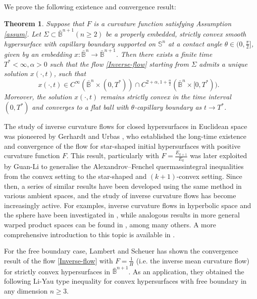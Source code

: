 \documentclass[11pt,reqno]{amsart}
\newtheorem{thm}{Theorem}[section]
\theoremstyle{definition}
\theoremstyle{remark}
\numberwithin{equation}{section}
\renewcommand{\(}{\left(}
\renewcommand{\)}{\right)}
\renewcommand{\-}{\overline}
\begin{document}
We prove the following  existence and convergence result:
\begin{thm}
Suppose that $F$ is a curvature function satisfying Assumption \ref{assum}. Let $\Sigma\subset\bar{\mathbb{B}}^{n+1} (n\geq 2)$ be a properly embedded, strictly convex smooth hypersurface with capillary boundary supported on $\mathbb{S}^n$ at a contact angle $\theta\in(0,\frac{\pi}{2}]$, given by an embedding $x:\bar{\mathbb{B}}^n\to\bar{\mathbb{B}}^{n+1}$. Then there exists a finite time $T^{*}<\infty,\alpha>0$ such that the flow \eqref{Inverse-flow} starting from $\Sigma$ admits a unique solution $x(\cdot,t)$, such that
	\begin{equation*}
		x(\cdot,t)\in C^{\infty}(\bar{\mathbb{B}}^n\times(0,T^{*}))\cap C^{2+\alpha,1+\frac{\alpha}{2}}(\bar{\mathbb{B}}^n\times[0,T^{*})).
	\end{equation*}
	Moreover, the solution $x(\cdot,t)$ remains strictly convex in the time interval $(0,T^{*})$ and converges to a flat ball with $\theta$-capillary boundary as $t\to T^{*}$.
\end{thm}

The study of inverse curvature flows for closed hypersurfaces in Euclidean space was pioneered by Gerhardt \cite{Ger90} and Urbas \cite{Urbas90}, who established the long-time existence and convergence of the flow for star-shaped initial  hypersurfaces with positive curvature function  $F$. This result, particularly with $F=\frac{E_{k+1}}{E_{k}}$ was later exploited by Guan-Li \cite{guanli09} to generalise the Alexandrov–Fenchel quermassintegral inequalities from the convex setting to the star-shaped and $(k+1)$-convex setting. Since then, a series of similar results have been developed using the same method in various ambient spaces, and the study of inverse curvature flows has become increasingly active.  For examples, inverse curvature flows in hyperbolic space and the sphere have been investigated in \cite{Ger11,Ger15,Liu17,Yu}, while analogous results in more general warped product spaces can be found in  \cite{BHW16,LW17,Scheuer17,Scheuer19}, among many others. A more comprehensive introduction to this topic is available in \cite{Scheuer19}.



For the free boundary case, Lambert and Scheuer \cite{Lambert-Scheuer2016} has shown the convergence result of the flow \eqref{Inverse-flow} with $F=\frac{1}{H}$  (i.e. the inverse mean curvature flow) for strictly convex hypersurfaces in $\bar{\mathbb{B}}^{n+1}$. As an application, they obtained the following Li-Yau type inequality for convex hypersurfaces with free boundary in any dimension $n\geq 3$.
\end{document}
